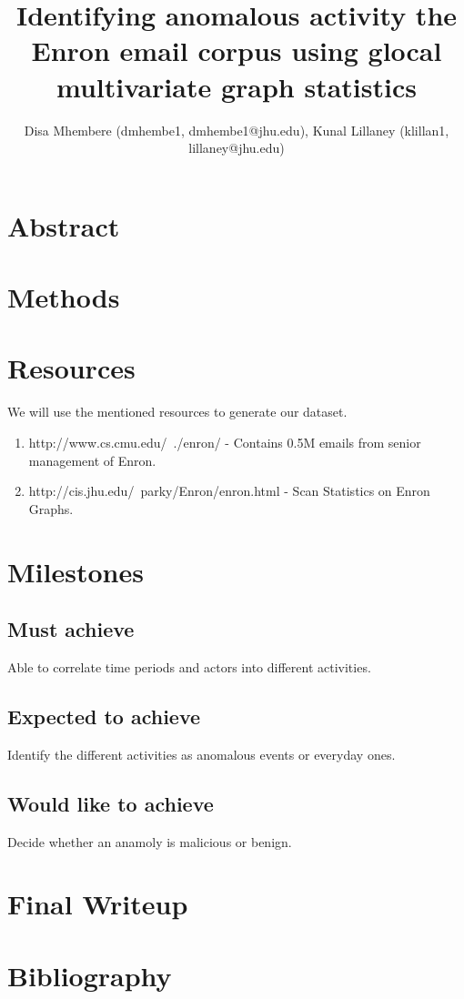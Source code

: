 \documentclass[11pt]{article}
\title{Identifying anomalous activity the Enron email corpus using glocal multivariate graph statistics}
\author{Disa Mhembere (dmhembe1, dmhembe1@jhu.edu), Kunal Lillaney (klillan1, lillaney@jhu.edu)}
\date{}
\begin{document}
\maketitle

\section{Abstract}

\section{Methods}

\section{Resources}
We will use the mentioned resources to generate our dataset.
\begin{enumerate}
  \item http://www.cs.cmu.edu/~./enron/ - Contains 0.5M emails from senior management of Enron. 
  \item http://cis.jhu.edu/~parky/Enron/enron.html - Scan Statistics on Enron Graphs.
\end{enumerate}
\section{Milestones}
\subsection{Must achieve}
Able to correlate time periods and actors into different activities. 
\subsection{Expected to achieve}
Identify the different activities as anomalous events or everyday ones. 
\subsection{Would like to achieve}
Decide whether an anamoly is malicious or benign.

\section{Final Writeup}

\section{Bibliography}

\end{document}
